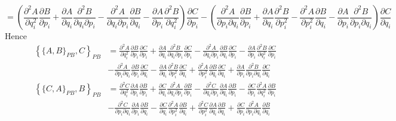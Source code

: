 \documentclass{article}
\begin{document}
\[  =  \left(\frac{\partial^2 A}{\partial q_{i}^2}				\frac{\partial B}{\partial p_{i}}
						+\frac{\partial A}{\partial q_{i}}						\frac{\partial^2 B}{\partial q_{i}\partial p_{i}} 
						-\frac{\partial^2 A}{\partial q_{i}\partial p_{i}}\frac{\partial B}{\partial q_{i}}
						-\frac{\partial A}{\partial p_{i}}						\frac{\partial^2 B}{\partial q_{i}^2}\right) \frac{\partial C}{\partial p_{i}}  
		-	\left(\frac{\partial^2 A}{\partial p_{i}\partial q_{i}} \frac{\partial B}{\partial p_{i}}
						+\frac{\partial A}{\partial q_{i}}						\frac{\partial^2 B}{\partial p_{i}^2} 
						-\frac{\partial^2 A}{\partial p_{i}^2}				\frac{\partial B}{\partial q_{i}}
						-\frac{\partial A}{\partial p_{i}} 						\frac{\partial^2 B}{\partial p_{i}\partial q_{i}}\right) \frac{\partial C}{\partial q_{i}} \] 
						Hence
\begin{align*} \left\{ \{A,B\}_{PB},C \right\}_{PB}    &= \boxed{\frac{\partial^2 A}{\partial q_{i}^2}				\frac{\partial B}{\partial p_{i}}\frac{\partial C}{\partial p_{i}}}
						+\frac{\partial A}{\partial q_{i}}						\frac{\partial^2 B}{\partial q_{i}\partial p_{i}} \frac{\partial C}{\partial p_{i}}
						-\frac{\partial^2 A}{\partial q_{i}\partial p_{i}}\frac{\partial B}{\partial q_{i}}\frac{\partial C}{\partial p_{i}}
						-\boxed{\frac{\partial A}{\partial p_{i}}						\frac{\partial^2 B}{\partial q_{i}^2} \frac{\partial C}{\partial p_{i}}}  \\
		&-	\frac{\partial^2 A}{\partial p_{i}\partial q_{i}} \frac{\partial B}{\partial p_{i}}\frac{\partial C}{\partial q_{i}}
						-\boxed{\frac{\partial A}{\partial q_{i}}						\frac{\partial^2 B}{\partial p_{i}^2} \frac{\partial C}{\partial q_{i}}}
						+\boxed{\frac{\partial^2 A}{\partial p_{i}^2}				\frac{\partial B}{\partial q_{i}}\frac{\partial C}{\partial q_{i}}}
						+\frac{\partial A}{\partial p_{i}} 						\frac{\partial^2 B}{\partial p_{i}\partial q_{i}} \frac{\partial C}{\partial q_{i}} \end{align*}
\begin{align*} \left\{ \{C,A\}_{PB},B \right\}_{PB}    &=  \boxed{\frac{\partial^2 C}{\partial q_{i}^2}				\frac{\partial A}{\partial p_{i}}\frac{\partial B}{\partial p_{i}}}
						+\frac{\partial C}{\partial q_{i}}						\frac{\partial^2 A}{\partial q_{i}\partial p_{i}} \frac{\partial B}{\partial p_{i}}
						-\frac{\partial^2 C}{\partial q_{i}\partial p_{i}}\frac{\partial A}{\partial q_{i}}\frac{\partial B}{\partial p_{i}}
						-\boxed{\frac{\partial C}{\partial p_{i}}						\frac{\partial^2 A}{\partial q_{i}^2} \frac{\partial B}{\partial p_{i}} } \\
		&-	\frac{\partial^2 C}{\partial p_{i}\partial q_{i}} \frac{\partial A}{\partial p_{i}}\frac{\partial B}{\partial q_{i}}
						-\boxed{\frac{\partial C}{\partial q_{i}}						\frac{\partial^2 A}{\partial p_{i}^2} \frac{\partial B}{\partial q_{i}}}
						+\boxed{\frac{\partial^2 C}{\partial p_{i}^2}				\frac{\partial A}{\partial q_{i}}\frac{\partial B}{\partial q_{i}}}
						+\frac{\partial C}{\partial p_{i}} 						\frac{\partial^2 A}{\partial p_{i}\partial q_{i}} \frac{\partial B}{\partial q_{i}} \end{align*}
\end{document}
